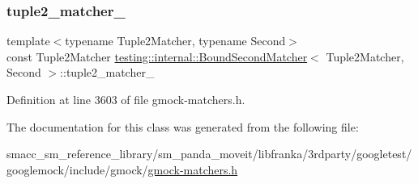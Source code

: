 \subsubsection{\texorpdfstring{tuple2\+\_\+matcher\+\_\+}{tuple2\_matcher\_}}
{\footnotesize\ttfamily template$<$typename Tuple2\+Matcher, typename Second$>$ \\
const Tuple2\+Matcher \hyperlink{classtesting_1_1internal_1_1BoundSecondMatcher}{testing\+::internal\+::\+Bound\+Second\+Matcher}$<$ Tuple2\+Matcher, Second $>$\+::tuple2\+\_\+matcher\+\_\+\hspace{0.3cm}{\ttfamily [private]}}



Definition at line 3603 of file gmock-\/matchers.\+h.



The documentation for this class was generated from the following file\+:\begin{DoxyCompactItemize}
\item 
smacc\+\_\+sm\+\_\+reference\+\_\+library/sm\+\_\+panda\+\_\+moveit/libfranka/3rdparty/googletest/googlemock/include/gmock/\hyperlink{gmock-matchers_8h}{gmock-\/matchers.\+h}\end{DoxyCompactItemize}
